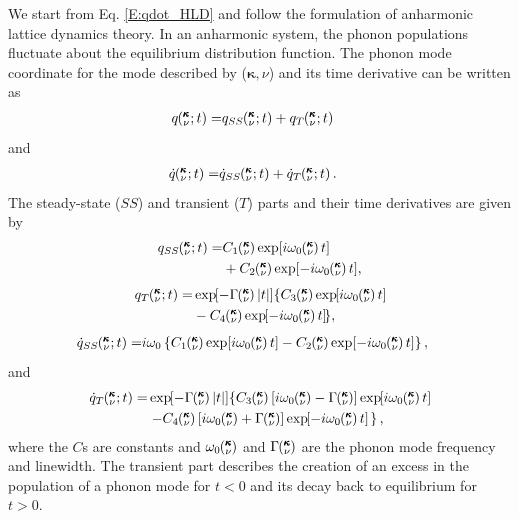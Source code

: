 We start from Eq$.$ \eqref{E:qdot_HLD} and follow the formulation of 
anharmonic lattice dynamics theory.
\cite{maradudin_dynamical_1974,wallace_thermodynamics_1972,
dove_introduction_1993,srivastava_physics_1990} In an 
anharmonic system, the phonon populations fluctuate about the
equilibrium distribution function.\cite{wallace_thermodynamics_1972} 
The phonon mode 
coordinate for the mode described by ($\pmb{\kappa},\nu$) and its time
derivative can be written as
\begin{equation}\label{A:E:q_A}
\begin{split}
q\kvt=&q_{SS}\kvt+q_{T}\kvt
\end{split}
\end{equation}
and
\begin{equation}\label{A:E:qdot_A}
\begin{split}
\dot{q}\kvt=& \dot{q}_{SS}\kvt+\dot{q}_{T}\kvt.
\end{split}
\end{equation}
The steady-state ($SS$) and transient ($T$) parts and their time 
derivatives are given by
\begin{equation}\label{A:E:q_A_SS}
\begin{split}
q_{SS}\kvt=& C_1\kv\exp[i\omega_0\kv t]
\\& +C_2\kv\exp[-i\omega_0\kv t],
\end{split}
\end{equation}
\begin{equation}\label{A:E:q_A_T}
\begin{split}
q_{T}\kvt=& \EXP{-\Gamma\kv |t|}\lbrace C_3\kv\EXP{i\omega_0\kv t}
\\ &-C_4\kv\EXP{-i\omega_0\kv t } \rbrace,
\end{split}
\end{equation}
\begin{equation}\label{A:E:qdot_A_SS}
\begin{split}
\dot{q}_{SS}\kvt=& i\omega_0\left\{C_1\kv\exp[i\omega_0\kv t]-C_2\kv
\exp[-i\omega_0\kv t]\right\} ,
\end{split}
\end{equation}
and
\begin{equation}\label{E:qdot_A_T}
\begin{split}
\dot{q}_{T}\kvt=& \EXP{-\Gamma\kv |t|}\left\{C_3\kv
\left[i\omega_0\kv-\Gamma\kv\right]\EXP{i\omega_0\kv t}\right. \\
& \left.-C_4\kv\left[i\omega_0\kv+\Gamma\kv\right]\EXP{-i\omega_0\kv t}\;
\right\},
\end{split}
\end{equation}
where the $C$s are constants and $\omega_0\mspace{-4.0mu}\left(\mspace{-8.0mu} \begin{smallmatrix}&\pmb{\kappa} \\&\nu \end{smallmatrix}\mspace{-3.0mu}\right)$ and $\Gamma\mspace{-4.0mu}\left(\mspace{-8.0mu} \begin{smallmatrix}&\pmb{\kappa} \\&\nu \end{smallmatrix}\mspace{-3.0mu}\right)$ are the 
phonon
mode frequency and linewidth.  The transient part
describes the creation of an excess in the population of a phonon mode 
for
$t<0$ and its decay back to equilibrium for $t>0$.

